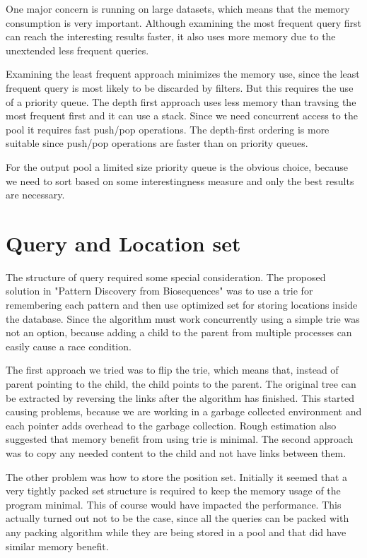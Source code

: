 One major concern is running on large datasets, which means that the memory consumption is very important. Although examining the most frequent query first can reach the interesting results faster, it also uses more memory due to the unextended less frequent queries.

Examining the least frequent approach minimizes the memory use, since the least frequent query is most likely to be discarded by filters. But this requires the use of a priority queue. The depth first approach uses less memory than travsing the most frequent first and it can use a stack. Since we need concurrent access to the pool it requires fast push/pop operations. The depth-first ordering is more suitable since push/pop operations are faster than on priority queues.

For the output pool a limited size priority queue is the obvious choice, because we need to sort based on some interestingness measure and only the best results are necessary.

\section{Query and Location set}

The structure of query required some special consideration. The proposed solution in "Pattern Discovery from Biosequences" was to use a trie for remembering each pattern and then use optimized set for storing locations inside the database. Since the algorithm must work concurrently using a simple trie was not an option, because adding a child to the parent from multiple processes can easily cause a race condition.

The first approach we tried was to flip the trie, which means that, instead of parent pointing to the child, the child points to the parent. The original tree can be extracted by reversing the links after the algorithm has finished. This started causing problems, because we are working in a garbage collected environment and each pointer adds overhead to the garbage collection. Rough estimation also suggested that memory benefit from using trie is minimal. The second approach was to copy any needed content to the child and not have links between them.

The other problem was how to store the position set. Initially it seemed that a very tightly packed set structure is required to keep the memory usage of the program minimal. This of course would have impacted the performance. This actually turned out not to be the case, since all the queries can be packed with any packing algorithm while they are being stored in a pool and that did have similar memory benefit.


